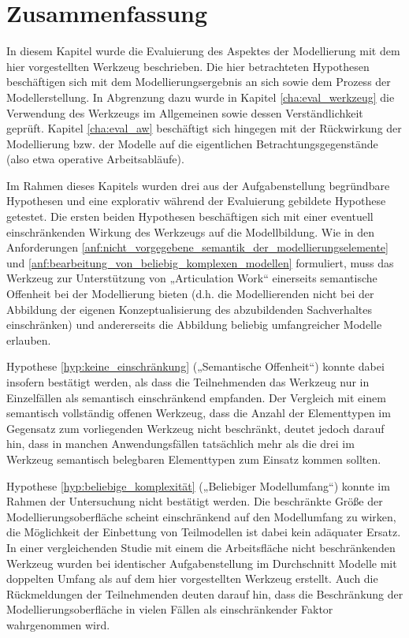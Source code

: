
\section{Zusammenfassung} %
\label{sec:m_zusammenfassung}

In diesem Kapitel wurde die Evaluierung des Aspektes der Modellierung mit dem hier vorgestellten Werkzeug beschrieben. Die hier betrachteten Hypothesen beschäftigen sich mit dem Modellierungsergebnis an sich sowie dem Prozess der Modellerstellung. In Abgrenzung dazu wurde in Kapitel \ref{cha:eval_werkzeug} die Verwendung des Werkzeugs im Allgemeinen sowie dessen Verständlichkeit geprüft. Kapitel \ref{cha:eval_aw} beschäftigt sich hingegen mit der Rückwirkung der Modellierung bzw. der Modelle auf die eigentlichen Betrachtungsgegenstände (also etwa operative Arbeitsabläufe).

Im Rahmen dieses Kapitels wurden drei aus der Aufgabenstellung begründbare Hypothesen und eine explorativ während der Evaluierung gebildete Hypothese getestet. Die ersten beiden Hypothesen beschäftigen sich mit einer eventuell einschränkenden Wirkung des Werkzeugs auf die Modellbildung. Wie in den Anforderungen \ref{anf:nicht_vorgegebene_semantik_der_modellierungselemente} und \ref{anf:bearbeitung_von_beliebig_komplexen_modellen} formuliert, muss das Werkzeug zur Unterstützung von „Articulation Work“ einerseits semantische Offenheit bei der Modellierung bieten (d.h. die Modellierenden nicht bei der Abbildung der eigenen Konzeptualisierung des abzubildenden Sachverhaltes einschränken) und andererseits die Abbildung beliebig umfangreicher Modelle erlauben. 

Hypothese \ref{hyp:keine_einschränkung} („Semantische Offenheit“) konnte dabei insofern bestätigt werden, als dass die Teilnehmenden das Werkzeug nur in Einzelfällen als semantisch einschränkend empfanden. Der Vergleich mit einem semantisch vollständig offenen Werkzeug, dass die Anzahl der Elementtypen im Gegensatz zum vorliegenden Werkzeug nicht beschränkt, deutet jedoch darauf hin, dass in manchen Anwendungsfällen tatsächlich mehr als die drei im Werkzeug semantisch belegbaren Elementtypen zum Einsatz kommen sollten.  

Hypothese \ref{hyp:beliebige_komplexität} („Beliebiger Modellumfang“) konnte im Rahmen der Untersuchung nicht bestätigt werden. Die beschränkte Größe der Modellierungsoberfläche scheint einschränkend auf den Modellumfang zu wirken, die Möglichkeit der Einbettung von Teilmodellen ist dabei kein adäquater Ersatz. In einer vergleichenden Studie mit einem die Arbeitsfläche nicht beschränkenden Werkzeug wurden bei identischer Aufgabenstellung im Durchschnitt Modelle mit doppelten Umfang als auf dem hier vorgestellten Werkzeug erstellt. Auch die Rückmeldungen der Teilnehmenden deuten darauf hin, dass die Beschränkung der Modellierungsoberfläche in vielen Fällen als einschränkender Faktor wahrgenommen wird.

